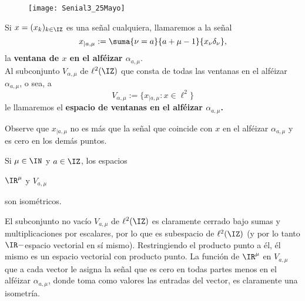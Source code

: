 \begin{figure}[H]
	\centering
	\texttt{[image: Senial3\_25Mayo]}
\end{figure}



\begin{defi} \label{ventanas y espacio de ventanas sobre un alfeizar}
Si $x=(x_{k})_{k \in \IZ}$ es una señal cualquiera,
llamaremos a la señal
\[
x_{|a, \mu}:= 
\suma{\nu=a}{a+\mu -1}{x_{\nu}\delta_{\nu}},
\]
la \textbf{ventana de $x$ en el alféizar $\alpha_{a, \mu}$}. \\ 
Al subconjunto $V_{\alpha , \mu}$ de $\ell^{2}(\IZ)$
que consta de todas las ventanas en el alféizar
$\alpha_{a, \mu}$, o sea, a
\[
V_{\alpha , \mu} := \{ x_{|a, \mu} : x \in \ell^{2} \}
\]
le llamaremos el \textbf{espacio de ventanas en el 
alféizar $\alpha_{a, \mu}$.}
\end{defi}

Observe que $x_{|a, \mu}$ no es más que la señal que
coincide con
$x$ en el alféizar $\alpha_{a,\mu}$ y es cero en los
demás puntos.

\begin{comment}
\begin{figure}[H]
	\centering
	\texttt{[image: 6Junio\_2]}
	\caption{Una señal arbitraria $x$ y algunas 
	de sus ventanas.}
\end{figure}
\end{comment}

\begin{prop} \label{espacio de ventanas es isometrico a un Rn}
Si $\mu \in \IN$ y $a \in \IZ$, los espacios
\begin{center}
$\IR^{\mu}$
\hspace{0.3cm} y \hspace{0.3cm}
$V_{a, \mu }$
\end{center}
son isométricos.
\end{prop} 
\demostracion 
El subconjunto no vacío $V_{a,\mu}$
de $\ell^{2}(\IZ)$
es claramente cerrado bajo sumas 
y multiplicaciones por escalares,
por lo que es subespacio de $\ell^{2}(\IZ)$ (y por lo 
tanto $\IR-$espacio vectorial en sí mismo). Restringiendo
el producto punto a él, él mismo es un espacio vectorial
con producto punto. 
La función de $\IR^{\mu}$ en 
$V_{a, \mu }$ que a cada vector le asigna 
la señal que es cero en todas partes menos
en el alféizar $\alpha_{a, \mu}$,
donde toma como valores las entradas del vector,
es claramente una isometría. \QEDB



